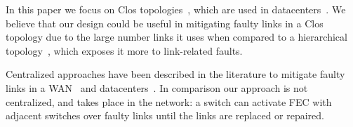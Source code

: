 In this paper we focus on Clos
topologies~\cite{clos_bstj1953}, 
which are used in datacenters~\cite{Singh:2016:JRD:2991470.2975159}.
We believe that our design could be useful in mitigating faulty links in a Clos
topology due to the large number links it uses when compared to a
hierarchical topology~\cite{Al-Fares:2008:SCD:1402946.1402967}, which 
exposes it more to link-related faults.

Centralized approaches have been described in the literature to mitigate
faulty links in a WAN~\cite{traffic-engineering-with-forward-fault-correction}
and datacenters~\cite{Zhuo:2017:UMP:3098822.3098849}. In comparison our approach
is not centralized, and takes place in the network: a switch can activate
FEC with adjacent switches over faulty links until the links are replaced or
repaired.

